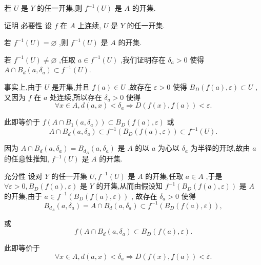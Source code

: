 若 $U$ 是 $Y$ 的任一开集,则 ${f}^{-1}\left( U\right)$ 是 $A$ 的开集.

证明 必要性 设 $f$ 在 $A$ 上连续, $U$ 是 $Y$ 的任一开集.

若 ${f}^{-1}\left( U\right)  = \varnothing$ ,则 ${f}^{-1}\left( U\right)$ 是 $A$ 的开集.

若 ${f}^{-1}\left( U\right)  \neq  \varnothing$ ,任取 $a \in  {f}^{-1}\left( U\right)$ ,我们证明存在 ${\delta }_{a} > 0$ 使得 $A \cap  {B}_{d}\left( {a,{\delta }_{a}}\right)  \subset  {f}^{-1}\left( U\right) .$

事实上,由于 $U$ 是开集,并且 $f\left( a\right)  \in  U$ ,故存在 $\varepsilon  > 0$ 使得 ${B}_{D}\left( {f\left( a\right) ,\varepsilon }\right)  \subset  U$ ,又因为 $f$ 在 $a$ 处连续,所以存在 ${\delta }_{a} > 0$ 使得
$$\forall x \in  A,d\left( {a,x}\right)  < {\delta }_{a} \Rightarrow  D\left( {f\left( x\right) ,f\left( a\right) }\right)  < \varepsilon .$$

此即等价于 $f\left( {A \cap  {B}_{1}\left( {a,{\delta }_{a}}\right) }\right)  \subset  {B}_{D}\left( {f\left( a\right) ,\varepsilon }\right)$ 或
$$A \cap  {B}_{d}\left( {a,{\delta }_{a}}\right)  \subset  {f}^{-1}\left( {{B}_{D}\left( {f\left( a\right) ,\varepsilon }\right) }\right)  \subset  {f}^{-1}\left( U\right) .$$

因为 $A \cap  {B}_{d}\left( {a,{\delta }_{a}}\right)  = {B}_{{d}_{A}}\left( {a,{\delta }_{a}}\right)$ 是 $A$ 的以 $a$ 为心以 ${\delta }_{a}$ 为半径的开球,故由 $a$ 的任意性推知, ${f}^{-1}\left( U\right)$ 是 $A$ 的开集.

充分性 设对 $Y$ 的任一开集 $U,{f}^{-1}\left( U\right)$ 是 $A$ 的开集,任取 $a \in  A$ ,于是 $\forall \varepsilon  > 0,{B}_{D}\left( {f\left( a\right) ,\varepsilon }\right)$ 是 $Y$ 的开集,从而由假设知 ${f}^{-1}\left( {{B}_{D}\left( {f\left( a\right) ,\varepsilon }\right) }\right)$ 是 $A$ 的开集,由于 $a \in  {f}^{-1}\left( {{B}_{D}\left( {f\left( a\right) ,\varepsilon }\right) }\right)$ , 故存在 ${\delta }_{a} > 0$ 使得
$${B}_{{d}_{A}}\left( {a,{\delta }_{a}}\right)  = A \cap  {B}_{d}\left( {a,{\delta }_{a}}\right)  \subset  {f}^{-1}\left( {{B}_{D}\left( {f\left( a\right) ,\varepsilon }\right) }\right) ,$$

或
$$f\left( {A \cap  {B}_{d}\left( {a,{\delta }_{a}}\right)  \subset  {B}_{D}\left( {f\left( a\right) ,\varepsilon }\right) .}\right.$$

此即等价于
$$\forall x \in  A,d\left( {a,x}\right)  < {\delta }_{a} \Rightarrow  D\left( {f\left( x\right) ,f\left( a\right) }\right)  < \bar{\varepsilon }.$$

